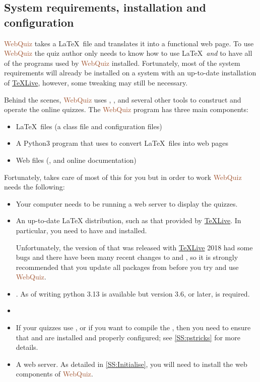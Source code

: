 \documentclass[svgnames]{article}
\newcommand\WebQuiz{\textcolor{Sienna}{WebQuiz}\xspace}
\newcommand\TeXLive{\href{https://www.tug.org/texlive/}{\TeX Live}\xspace}
\newcommand\Ctan{\ctan[]{ctan}\xspace}
\begin{document}
  \subsection{System requirements, installation and configuration}
    \label{S:configuration}

    \WebQuiz takes a \LaTeX\ file and translates it into a functional
    web page. To use \WebQuiz the quiz author only needs to know how to
    use \LaTeX\ \textit{and} to have all of the programs used by \WebQuiz
    installed. Fortunately, most of the system requirements will already
    be installed on a system with an up-to-date installation of
    \TeXLive, however, some tweaking may still be necessary.

    Behind the scenes, \WebQuiz uses \TeXfht, \python, \Javascript and
    several other tools to construct and operate the online quizzes.
    The \WebQuiz program has three main components:
      \begin{itemize}
           \item \LaTeX\ files (a class file and \TeXfht configuration files)
           \item A Python3 program that uses \TeXfht to convert \LaTeX\
           files into web pages
           \item Web files (\Javascript, \CSS and online documentation)
      \end{itemize}
    Fortunately, \Ctan takes care of most of this for you but in order to work \WebQuiz needs the following:
  \begin{itemize}[nosep]
     \item Your computer needs to be running a web server to display the
     quizzes.

     \item An up-to-date \LaTeX{} distribution, such as that provided
     by \TeXLive. In particular, you need to have \TeXfht{} and
      installed.

     Unfortunately, the version of  that was released
     with \TeXLive{} 2018 had some bugs and there have been many
     recent changes to \ctan{make4ht} and \ctan{pstricks},
     so it is strongly recommended that you update all packages
     from \Ctan before you try and use \WebQuiz.

      \item \python[Python 3]. As of writing python 3.13 is available
      but version 3.6, or later, is required.
      \item \Javascript
      \item If your quizzes use , or if you want to
      compile the \OnlineManual, then you need to ensure that
      \Ghostscript and  are installed and properly
      configured; see \autoref{SS:pstricks} for more details.
      \item A web server. As detailed in \autoref{SS:Initialise}, you
      will need to install the web components of \WebQuiz.
  \end{itemize}
\end{document}
